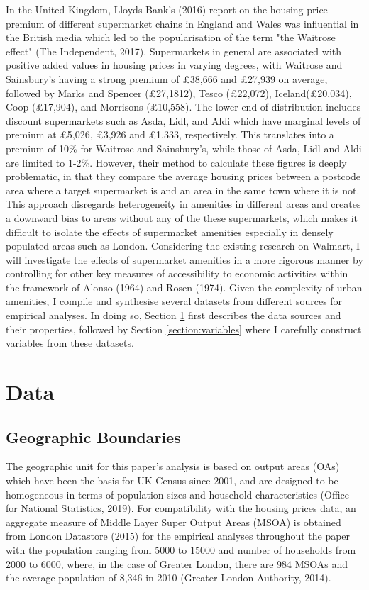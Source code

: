 \documentclass{article}
\begin{document}
In the United Kingdom, Lloyds Bank's (2016) report on the housing price premium of different supermarket chains in England and Wales was influential in the British media which led to the popularisation of the term "the Waitrose effect" (The Independent, 2017). Supermarkets in general are associated with positive added values in housing prices in varying degrees, with Waitrose and Sainsbury's having a strong premium of £38,666 and £27,939 on average, followed by Marks and Spencer (£27,1812), Tesco (£22,072), Iceland(£20,034), Coop (£17,904), and Morrisons (£10,558). The lower end of distribution includes discount supermarkets such as Asda, Lidl, and Aldi which have marginal levels of premium at £5,026, £3,926 and £1,333, respectively. This translates into a premium of 10\% for Waitrose and Sainsbury's, while those of Asda, Lidl and Aldi are limited to 1-2\%. However, their method to calculate these figures is deeply problematic, in that they compare the average housing prices between a postcode area where a target supermarket is and an area in the same town where it is not. This approach disregards heterogeneity in amenities in different areas and creates a downward bias to areas without any of the these supermarkets, which makes it difficult to isolate the effects of supermarket amenities especially in densely populated areas such as London. Considering the existing research on Walmart, I will investigate the effects of supermarket amenities in a more rigorous manner by controlling for other key measures of accessibility to economic activities within the framework of Alonso (1964) and Rosen (1974). Given the complexity of urban amenities, I compile and synthesise several datasets from different sources for empirical analyses. In doing so, Section \ref{section:data} first describes the data sources and their properties, followed by Section \ref{section:variables} where I carefully construct variables from these datasets.


\section{Data} \label{section:data}
\subsection{Geographic Boundaries}
The geographic unit for this paper's analysis is based on output areas (OAs) which have been the basis for UK Census since 2001, and are designed to be homogeneous in terms of population sizes and household characteristics (Office for National Statistics, 2019). For compatibility with the housing prices data, an aggregate measure of Middle Layer Super Output Areas (MSOA) is obtained from London Datastore (2015) for the empirical analyses throughout the paper with the population ranging from 5000 to 15000 and number of households from 2000 to 6000, where, in the case of Greater London, there are 984 MSOAs and the average population of 8,346 in 2010 (Greater London Authority, 2014).
\end{document}
